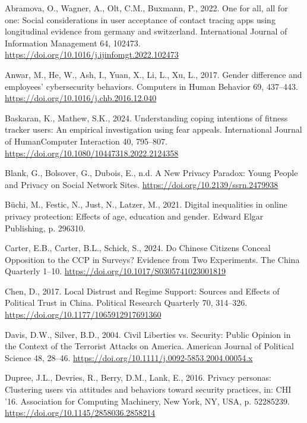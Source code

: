 \documentclass[
  letterpaper,
  DIV=11,
  numbers=noendperiod]{scrartcl}
\newlength{\cslhangindent}
\newenvironment{CSLReferences}[2] %
 {\begin{list}{}{%
  \setlength{\itemindent}{0pt}
  \setlength{\leftmargin}{0pt}
  \setlength{\parsep}{0pt}
  \ifodd #1
   \setlength{\leftmargin}{\cslhangindent}
   \setlength{\itemindent}{-1\cslhangindent}
  \fi
  \setlength{\itemsep}{#2\baselineskip}}}
 {\end{list}}
\begin{document}
\label{refs}
\begin{CSLReferences}{1}{0}
Abramova, O., Wagner, A., Olt, C.M., Buxmann, P., 2022. One for all, all
for one: Social considerations in user acceptance of contact tracing
apps using longitudinal evidence from germany and switzerland.
International Journal of Information Management 64, 102473.
\url{https://doi.org/10.1016/j.ijinfomgt.2022.102473}

Anwar, M., He, W., Ash, I., Yuan, X., Li, L., Xu, L., 2017. Gender
difference and employees' cybersecurity behaviors. Computers in Human
Behavior 69, 437--443. \url{https://doi.org/10.1016/j.chb.2016.12.040}

Baskaran, K., Mathew, S.K., 2024. Understanding coping intentions of
fitness tracker users: An empirical investigation using fear appeals.
International Journal of Human{\textendash}Computer Interaction 40,
795--807. \url{https://doi.org/10.1080/10447318.2022.2124358}

Blank, G., Bolsover, G., Dubois, E., n.d. A New Privacy Paradox: Young
People and Privacy on Social Network Sites.
\url{https://doi.org/10.2139/ssrn.2479938}

Büchi, M., Festic, N., Just, N., Latzer, M., 2021. Digital inequalities
in online privacy protection: Effects of age, education and gender.
Edward Elgar Publishing, p. 296310.

Carter, E.B., Carter, B.L., Schick, S., 2024. Do Chinese Citizens
Conceal Opposition to the CCP in Surveys? Evidence from Two Experiments.
The China Quarterly 1--10.
\url{https://doi.org/10.1017/S0305741023001819}

Chen, D., 2017. Local Distrust and Regime Support: Sources and Effects
of Political Trust in China. Political Research Quarterly 70, 314--326.
\url{https://doi.org/10.1177/1065912917691360}

Davis, D.W., Silver, B.D., 2004. Civil Liberties vs. Security: Public
Opinion in the Context of the Terrorist Attacks on America. American
Journal of Political Science 48, 28--46.
\url{https://doi.org/10.1111/j.0092-5853.2004.00054.x}

Dupree, J.L., Devries, R., Berry, D.M., Lank, E., 2016. Privacy
personas: Clustering users via attitudes and behaviors toward security
practices, in: CHI '16. Association for Computing Machinery, New York,
NY, USA, p. 52285239. \url{https://doi.org/10.1145/2858036.2858214}


\end{CSLReferences}
\end{document}
